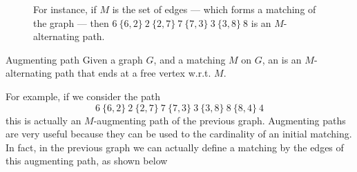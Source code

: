 \documentclass[a4paper, 12pt]{report}
\begin{document}
    \begin{figure}[H]
        \centering
        \caption{For instance, if $M$ is the set of  edges --- which forms a matching of the graph --- then $6 \ \{6, 2\} \ 2 \ \{2, 7\} \ 7 \ \{7, 3\} \ 3 \ \{3, 8\} \ 8$ is an $M$-alternating path.}
    \end{figure}
    
    \begin{frameddefn}{Augmenting path}
        Given a graph $G$, and a matching $M$ on $G$, an  is an $M$-alternating path that ends at a free vertex w.r.t. $M$.
    \end{frameddefn}

    For example, if we consider the path $$6 \ \{6, 2\} \ 2 \ \{2, 7\} \ 7 \ \{7, 3\} \ 3 \ \{3, 8\} \ 8 \ \{8, 4 \} \ 4$$ this is actually an $M$-augmenting path of the previous graph. Augmenting paths are very useful because they can be used to  the cardinality of an initial matching. In fact, in the previous graph we can actually define a  matching by  the edges of this augmenting path, as shown below
\end{document}
